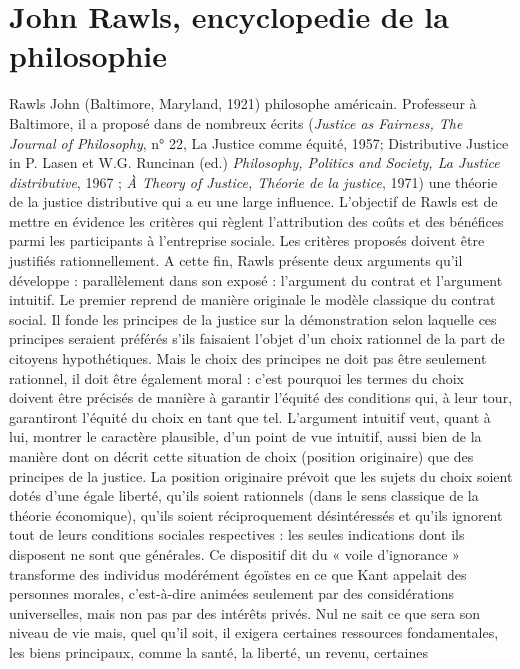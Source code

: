
\chapter{John Rawls, encyclopedie de la philosophie}
Rawls John (Baltimore, Maryland, 1921)
philosophe américain. Professeur à Baltimore, il a proposé dans de nombreux
écrits ({\it Justice as Fairness, The Journal of
Philosophy}, n° 22, {\it }La Justice comme
équité, 1957; {\it }Distributive Justice in
P. Lasen et W.G. Runcinan (ed.) {\it Philosophy, Politics and Society, La Justice distributive}, 1967 ;
 {\it À Theory of Justice, Théorie
de la justice}, 1971) une théorie de la justice distributive qui a eu une large
influence. L'objectif de Rawls est de
mettre en évidence les critères qui règlent
l'attribution des coûts et des bénéfices
parmi les participants à l’entreprise
sociale. Les critères proposés doivent être
justifiés rationnellement. A cette fin,
Rawls présente deux arguments qu’il
développe : parallèlement dans son
exposé : l'argument du contrat et l’argument intuitif. Le premier reprend de
manière originale le modèle classique du
contrat social. Il fonde les principes de la
justice sur la démonstration selon laquelle
ces principes seraient préférés s'ils faisaient l'objet d’un choix rationnel de la
part de citoyens hypothétiques. Mais le
choix des principes ne doit pas être seulement rationnel, il doit être également
moral : c’est pourquoi les termes du choix
doivent être précisés de manière à garantir l'équité des conditions qui, à leur tour,
garantiront l'équité du choix en tant que
tel. L’argument intuitif veut, quant à lui,
montrer le caractère plausible, d’un point
de vue intuitif, aussi bien de la manière
dont on décrit cette situation de choix
(position originaire) que des principes de
la justice. La position originaire prévoit
que les sujets du choix soient dotés d’une
égale liberté, qu'ils soient rationnels (dans
%
le sens classique de la théorie économique), qu'ils soient réciproquement
désintéressés et qu'ils ignorent tout de
leurs conditions sociales respectives : les
seules indications dont ils disposent ne
sont que générales. Ce dispositif dit du
« voile d’ignorance » transforme des individus modérément égoïstes en ce que
Kant appelait des personnes morales,
c'est-à-dire animées seulement par des
considérations universelles, mais non pas
par des intérêts privés. Nul ne sait ce que
sera son niveau de vie mais, quel qu’il
soit, il exigera certaines ressources fondamentales, les biens principaux, comme la
santé, la liberté, un revenu, certaines
